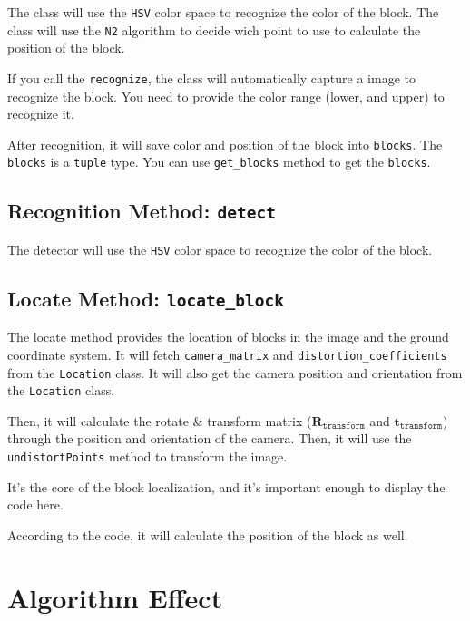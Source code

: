 \documentclass{article}
\begin{document}
The class will use the \texttt{HSV} color space to recognize the color of the block. The class will use the \texttt{N2} algorithm to decide wich point to use to calculate the position of the block.

If you call the \texttt{recognize}, the class will automatically capture a image to recognize the block. You need to provide the color range (lower, and upper) to recognize it.

After recognition, it will save color and position of the block into \texttt{blocks}. The \texttt{blocks} is a \texttt{tuple} type. You can use \texttt{get\_blocks} method to get the \texttt{blocks}.

\subsection{Recognition Method: \texttt{detect}}

The detector will use the \texttt{HSV} color space to recognize the color of the block.



\subsection{Locate Method: \texttt{locate\_block}}
The locate method provides the location of blocks in the image and the ground coordinate system. It will fetch \texttt{camera\_matrix} and \texttt{distortion\_coefficients} from the \texttt{Location} class. It will also get the camera position and orientation from the \texttt{Location} class.

Then, it will calculate the rotate \& transform matrix ($\boldsymbol{R}_{\texttt{transform}}$ and $\boldsymbol{t}_{\texttt{transform}}$) through the position and orientation of the camera. Then, it will use the \texttt{undistortPoints} method to transform the image.

It's the core of the block localization, and it's important enough to display the code here.



According to the code, it will calculate the position of the block as well.

\section{Algorithm Effect}
\end{document}
